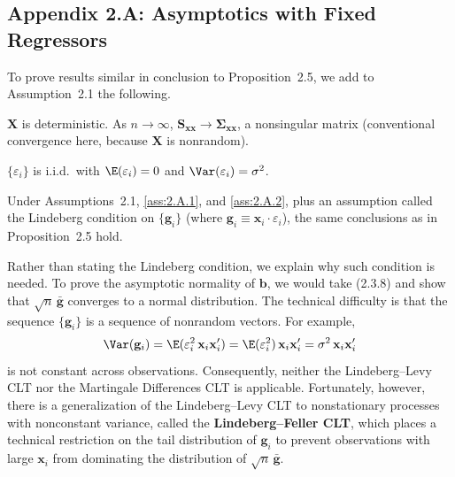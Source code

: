 
\subsection*{Appendix 2.A: Asymptotics with Fixed Regressors}

To prove results similar in conclusion to Proposition~2.5, we add to Assumption~2.1 the following.

\begin{assumption}[2.A.1]
\label{ass:2.A.1}
$\mathbf{X}$ is deterministic. As $n \to \infty$,
$\mathbf{S}_{\mathbf{xx}} \to \bm{\Sigma}_{\mathbf{xx}}$, a nonsingular matrix
(conventional convergence here, because $\mathbf{X}$ is nonrandom).
\end{assumption}

\begin{assumption}[2.A.2]
\label{ass:2.A.2}
$\{\varepsilon_i\}$ is i.i.d.\ with $\E(\varepsilon_i) = 0$ and $\Var(\varepsilon_i) = \sigma^2$.
\end{assumption}

\begin{proposition}
\label{prop:2.A.1}
Under Assumptions~2.1, \ref{ass:2.A.1}, and \ref{ass:2.A.2}, plus an assumption
called the Lindeberg condition on $\{\mathbf{g}_i\}$ (where
$\mathbf{g}_i \equiv \mathbf{x}_i \cdot \varepsilon_i$), the same conclusions as in Proposition~2.5 hold.
\end{proposition}

Rather than stating the Lindeberg condition, we explain why such condition is
needed. To prove the asymptotic normality of $\mathbf{b}$, we would take (2.3.8) and show
that $\sqrt{n}\,\bar{\mathbf{g}}$ converges to a normal distribution. The technical difficulty is that
the sequence $\{\mathbf{g}_i\}$ is a sequence of nonrandom vectors. For example,
\[
\Var(\mathbf{g}_i) = \E(\varepsilon_i^2\,\mathbf{x}_i\mathbf{x}_i')
= \E(\varepsilon_i^2)\,\mathbf{x}_i\mathbf{x}_i'
= \sigma^2\,\mathbf{x}_i\mathbf{x}_i'
\]
is not constant across observations. Consequently, neither the Lindeberg--Levy CLT
nor the Martingale Differences CLT is applicable. Fortunately, however, there
is a generalization of the Lindeberg--Levy CLT to nonstationary processes with
nonconstant variance, called the \textbf{Lindeberg--Feller CLT}, which places a technical
restriction on the tail distribution of $\mathbf{g}_i$ to prevent observations with large
$\mathbf{x}_i$ from dominating the distribution of $\sqrt{n}\,\bar{\mathbf{g}}$.


